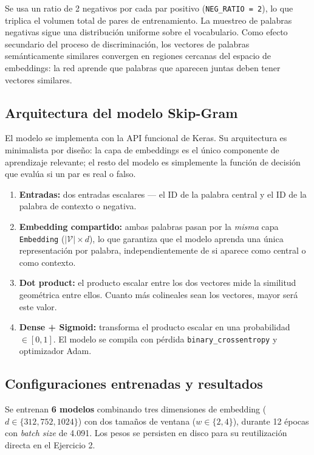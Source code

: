 \documentclass{article}
\begin{document}
Se usa un ratio de 2 negativos por cada par positivo (\texttt{NEG\_RATIO = 2}), lo que
triplica el volumen total de pares de entrenamiento. La muestreo de palabras negativas sigue
una distribución uniforme sobre el vocabulario. Como efecto secundario del proceso de
discriminación, los vectores de palabras semánticamente similares convergen en regiones
cercanas del espacio de embeddings: la red aprende que palabras que aparecen juntas deben
tener vectores similares.

\subsection{Arquitectura del modelo Skip-Gram}

El modelo se implementa con la API funcional de Keras. Su arquitectura es minimalista por
diseño: la capa de embeddings es el único componente de aprendizaje relevante; el resto
del modelo es simplemente la función de decisión que evalúa si un par es real o falso.

\begin{enumerate}
  \item \textbf{Entradas:} dos entradas escalares --- el ID de la palabra central y el ID
        de la palabra de contexto o negativa.
  \item \textbf{Embedding compartido:} ambas palabras pasan por la \textit{misma} capa
        \texttt{Embedding} ($|\mathcal{V}| \times d$), lo que garantiza que el modelo
        aprenda una única representación por palabra, independientemente de si aparece
        como central o como contexto.
  \item \textbf{Dot product:} el producto escalar entre los dos vectores mide la similitud
        geométrica entre ellos. Cuanto más colineales sean los vectores, mayor será este
        valor.
  \item \textbf{Dense + Sigmoid:} transforma el producto escalar en una probabilidad
        $\in [0,1]$. El modelo se compila con pérdida \texttt{binary\_crossentropy} y
        optimizador Adam.
\end{enumerate}

\subsection{Configuraciones entrenadas y resultados}

Se entrenan \textbf{6 modelos} combinando tres dimensiones de embedding
($d \in \{312, 752, 1024\}$) con dos tamaños de ventana ($w \in \{2, 4\}$), durante
12 épocas con \textit{batch size} de 4.091. Los pesos se persisten en disco para su
reutilización directa en el Ejercicio 2.
\end{document}
